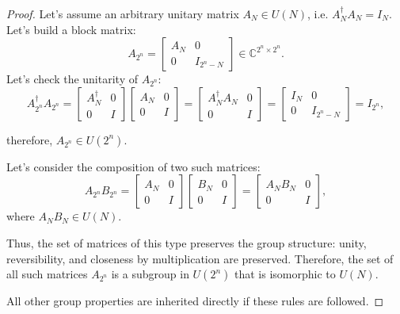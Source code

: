 \documentclass[a4paper, openany, 12pt]{article}
\theoremstyle{remark}
\theoremstyle{definition}
\begin{document}
\begin{proof}
Let's assume an arbitrary unitary matrix $A_N\in U(N)$, i.e. $A_N^\dagger A_N=I_N$. Let's build a block matrix:
\begin{equation}
    A_{2^n} = \begin{bmatrix}
        A_N & 0 \\
        0 & I_{2^n - N}
    \end{bmatrix} \in \mathbb{C}^{2^n \times 2^n}.
\end{equation}
Let's check the unitarity of $A_{2^n}$:
\begin{equation}
A_{2^n}^\dagger A_{2^n} =
\begin{bmatrix}
    A_N^\dagger & 0 \\
    0 & I
\end{bmatrix}
\begin{bmatrix}
    A_N & 0 \\
    0 & I
\end{bmatrix}
=
\begin{bmatrix}
    A_N^\dagger A_N & 0 \\
    0 & I
\end{bmatrix}
=
\begin{bmatrix}
    I_N & 0 \\
    0 & I_{2^n - N}
\end{bmatrix}
= I_{2^n},
\end{equation}



therefore, $A_{2^n} \in U(2^n)$.

Let's consider the composition of two such matrices:
\begin{equation}
    A_{2^n}B_{2^n} = 
    \begin{bmatrix}
        A_N & 0 \\
        0 & I
    \end{bmatrix}
    \begin{bmatrix}
        B_N & 0 \\
        0 & I
    \end{bmatrix}
    =
    \begin{bmatrix}
        A_NB_N & 0 \\
        0 & I
    \end{bmatrix},
\end{equation}
where $A_NB_N \in U(N)$.

Thus, the set of matrices of this type preserves the group structure: unity, reversibility, and closeness by multiplication are preserved. Therefore, the set of all such matrices $A_{2^n}$ is a subgroup in $U(2^n)$ that is isomorphic to $U(N)$.

All other group properties are inherited directly if these rules are followed.
\end{proof}
\end{document}
